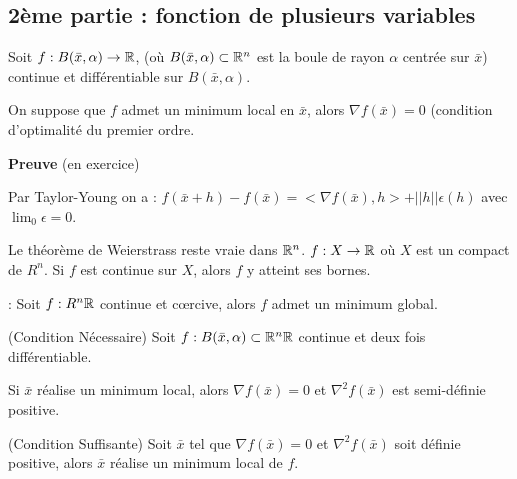 		\subsection{2ème partie : fonction de plusieurs variables}
		
		\begin{theoreme}		
		Soit $f : B(\bar{x}, \alpha) \rightarrow \mathbb{R}$,  (où $B(\bar{x}, \alpha) \subset \mathbb{R}^n$ est la boule de rayon $\alpha$ centrée sur $\bar{x}$) continue et différentiable sur $B(\bar{x}, \alpha)$.
		
		On suppose que $f$ admet un minimum local en $\bar{x}$, alors $\nabla f(\bar{x}) = 0$ (condition d'optimalité du premier ordre.
		\end{theoreme}
		
		\textbf{Preuve} (en exercice)
		
		Par Taylor-Young on a : $f(\bar{x}+h)-f(\bar{x}) = < \nabla f(\bar{x}) ,h> + ||h|| \epsilon(h)$ avec $\lim_0 \epsilon = 0$.
		
		
		Le théorème de Weierstrass reste vraie dans $\mathbb{R}^n$.
		$f:X\rightarrow \mathbb{R}$ où $X$ est un compact de $R^n$.
		Si $f$ est continue sur $X$, alors $f$ y atteint ses bornes.
		
		\begin{theoreme} : 
		Soit $f:R^n \mathbb{R}$ continue et c\oe rcive, alors $f$ admet un minimum global.
		\end{theoreme}
		
		\begin{theoreme} (Condition Nécessaire)
		Soit $f : B(\bar{x}, \alpha) \subset \mathbb{R}^n \mathbb{R}$ continue et deux fois différentiable.
		
		Si $\bar{x}$ réalise un minimum local, alors $\nabla f(\bar{x}) = 0$ et $\nabla^2 f(\bar{x})$ est semi-définie positive.
		\end{theoreme}
		
		\begin{theoreme} (Condition Suffisante)
		Soit $\bar{x}$ tel que $\nabla f(\bar{x}) = 0$ et $\nabla^2 f(\bar{x})$ soit définie positive, alors $\bar{x}$ réalise un minimum local de $f$.
		\end{theoreme}
		
